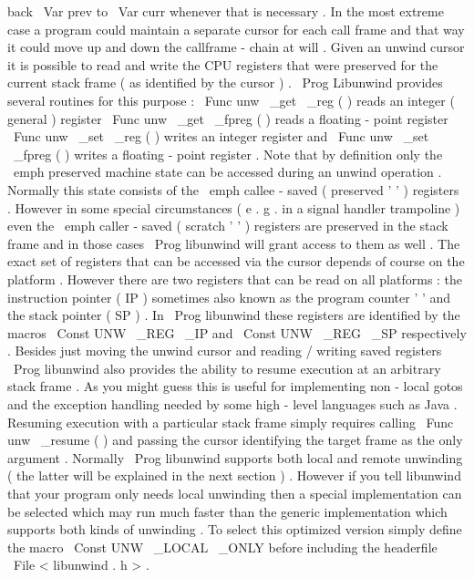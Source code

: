 back
\
Var
{
prev
}
to
\
Var
{
curr
}
whenever
that
is
necessary
.
In
the
most
extreme
case
a
program
could
maintain
a
separate
cursor
for
each
call
frame
and
that
way
it
could
move
up
and
down
the
callframe
-
chain
at
will
.
Given
an
unwind
cursor
it
is
possible
to
read
and
write
the
CPU
registers
that
were
preserved
for
the
current
stack
frame
(
as
identified
by
the
cursor
)
.
\
Prog
{
Libunwind
}
provides
several
routines
for
this
purpose
:
\
Func
{
unw
\
_get
\
_reg
}
(
)
reads
an
integer
(
general
)
register
\
Func
{
unw
\
_get
\
_fpreg
}
(
)
reads
a
floating
-
point
register
\
Func
{
unw
\
_set
\
_reg
}
(
)
writes
an
integer
register
and
\
Func
{
unw
\
_set
\
_fpreg
}
(
)
writes
a
floating
-
point
register
.
Note
that
by
definition
only
the
\
emph
{
preserved
}
machine
state
can
be
accessed
during
an
unwind
operation
.
Normally
this
state
consists
of
the
\
emph
{
callee
-
saved
}
(
preserved
'
'
)
registers
.
However
in
some
special
circumstances
(
e
.
g
.
in
a
signal
handler
trampoline
)
even
the
\
emph
{
caller
-
saved
}
(
scratch
'
'
)
registers
are
preserved
in
the
stack
frame
and
in
those
cases
\
Prog
{
libunwind
}
will
grant
access
to
them
as
well
.
The
exact
set
of
registers
that
can
be
accessed
via
the
cursor
depends
of
course
on
the
platform
.
However
there
are
two
registers
that
can
be
read
on
all
platforms
:
the
instruction
pointer
(
IP
)
sometimes
also
known
as
the
program
counter
'
'
and
the
stack
pointer
(
SP
)
.
In
\
Prog
{
libunwind
}
these
registers
are
identified
by
the
macros
\
Const
{
UNW
\
_REG
\
_IP
}
and
\
Const
{
UNW
\
_REG
\
_SP
}
respectively
.
Besides
just
moving
the
unwind
cursor
and
reading
/
writing
saved
registers
\
Prog
{
libunwind
}
also
provides
the
ability
to
resume
execution
at
an
arbitrary
stack
frame
.
As
you
might
guess
this
is
useful
for
implementing
non
-
local
gotos
and
the
exception
handling
needed
by
some
high
-
level
languages
such
as
Java
.
Resuming
execution
with
a
particular
stack
frame
simply
requires
calling
\
Func
{
unw
\
_resume
}
(
)
and
passing
the
cursor
identifying
the
target
frame
as
the
only
argument
.
Normally
\
Prog
{
libunwind
}
supports
both
local
and
remote
unwinding
(
the
latter
will
be
explained
in
the
next
section
)
.
However
if
you
tell
libunwind
that
your
program
only
needs
local
unwinding
then
a
special
implementation
can
be
selected
which
may
run
much
faster
than
the
generic
implementation
which
supports
both
kinds
of
unwinding
.
To
select
this
optimized
version
simply
define
the
macro
\
Const
{
UNW
\
_LOCAL
\
_ONLY
}
before
including
the
headerfile
\
File
{
<
libunwind
.
h
>
}
.
